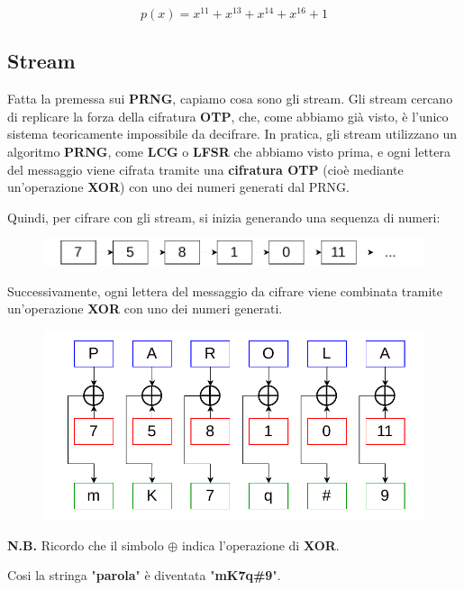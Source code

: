 \documentclass{report}
\begin{document}
\begin{equation*}
    p(x) = x^{11} +x^{13} + x^{14} + x^{16} +1
\end{equation*}

\newpage

\subsection{Stream} 

Fatta la premessa sui \textbf{PRNG}, capiamo cosa sono gli stream.  
Gli stream cercano di replicare la forza della cifratura \textbf{OTP}, che, come abbiamo già visto, è l'unico sistema teoricamente impossibile da decifrare.  
In pratica, gli stream utilizzano un algoritmo \textbf{PRNG}, come \textbf{LCG} o \textbf{LFSR} che abbiamo visto prima, e ogni lettera del messaggio viene cifrata tramite una \textbf{cifratura OTP} (cioè mediante un'operazione \textbf{XOR}) con uno dei numeri generati dal PRNG.

Quindi, per cifrare con gli stream, si inizia generando una sequenza di numeri:

\begin{figure}[h]
    \centering 
    \includegraphics[width=0.8\linewidth]{logos/4_1cripto.pdf}
\end{figure}

Successivamente, ogni lettera del messaggio da cifrare viene combinata tramite un'operazione \textbf{XOR} con uno dei numeri generati.

\begin{figure}[h]
    \centering
    \includegraphics[width=0.8\linewidth]{logos/4_2cripto.pdf}
\end{figure}


\textbf{N.B.} Ricordo che il simbolo $\oplus$ indica l'operazione di \textbf{XOR}.


Cosi la stringa "\textbf{parola}" è diventata "\textbf{mK7q\#9}".
\end{document}
